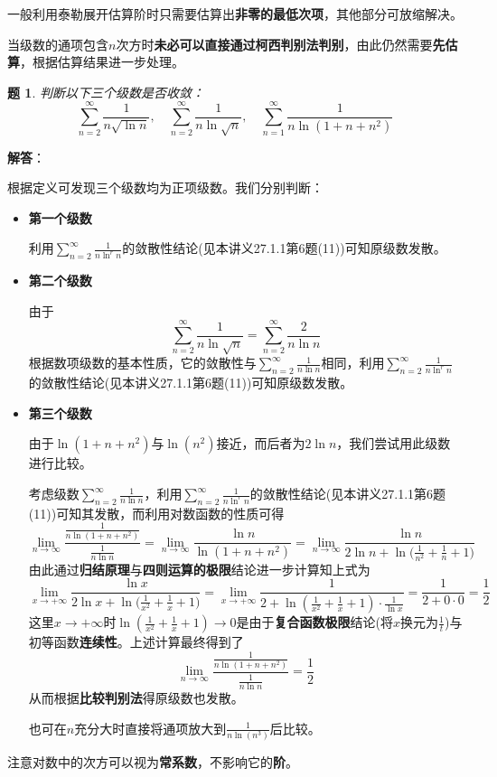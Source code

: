 \documentclass[a4paper,UTF8,fontset=windows,AutoFakeBold]{ctexart}
\newcommand*{\suminf}[1][n=1]{\sum_{#1}^\infty}
\newcommand*{\note}{\noindent *}
\theoremstyle{ex}
\newtheorem{exercise}{题}
\newcommand{\sol}[1]{{\vspace{5pt}\kaishu\noindent\textbf{解答}：\vspace{-3pt}
\begin{compactitem}
    \item[] #1
\end{compactitem}
}}
\begin{document}
\note 一般利用泰勒展开估算阶时只需要估算出\textbf{非零的最低次项}，其他部分可放缩解决。

\note 当级数的通项包含$n$次方时\textbf{未必可以直接通过柯西判别法判别}，由此仍然需要\textbf{先估算}，根据估算结果进一步处理。

\begin{framed}
\begin{exercise}
    判断以下三个级数是否收敛：
    $$\suminf[n=2]\frac{1}{n\sqrt{\ln n}},\quad\suminf[n=2]\frac{1}{n\ln\sqrt{n}},\quad\suminf\frac{1}{n\ln(1+n+n^2)}$$
\end{exercise}
\sol{
    根据定义可发现三个级数均为正项级数。我们分别判断：
    \begin{itemize}
        \item \textbf{第一个级数}
        
        利用$\suminf[n=2]\frac{1}{n\ln^rn}$的敛散性结论(见本讲义27.1.1第6题(11))可知原级数发散。

        \item \textbf{第二个级数}
        
        由于
        $$\suminf[n=2]\frac{1}{n\ln\sqrt{n}}=\suminf[n=2]\frac{2}{n\ln n}$$
        根据数项级数的基本性质，它的敛散性与$\suminf[n=2]\frac{1}{n\ln n}$相同，利用$\suminf[n=2]\frac{1}{n\ln^rn}$的敛散性结论(见本讲义27.1.1第6题(11))可知原级数发散。

        \item \textbf{第三个级数}
        
        由于$\ln(1+n+n^2)$与$\ln(n^2)$接近，而后者为$2\ln n$，我们尝试用此级数进行比较。

        考虑级数$\suminf[n=2]\frac{1}{n\ln n}$，利用$\suminf[n=2]\frac{1}{n\ln^rn}$的敛散性结论(见本讲义27.1.1第6题(11))可知其发散，而利用对数函数的性质可得
        $$\lim_{n\to\infty}\frac{\frac{1}{n\ln(1+n+n^2)}}{\frac{1}{n\ln n}}=\lim_{n\to\infty}\frac{\ln n}{\ln(1+n+n^2)}=\lim_{n\to\infty}\frac{\ln n}{2\ln n+\ln\big(\frac{1}{n^2}+\frac{1}{n}+1\big)}$$
        由此通过\textbf{归结原理}与\textbf{四则运算的极限}结论进一步计算知上式为
        $$\lim_{x\to+\infty}\frac{\ln x}{2\ln x+\ln\big(\frac{1}{x^2}+\frac{1}{x}+1\big)}=\lim_{x\to+\infty}\frac{1}{2+\ln(\frac{1}{x^2}+\frac{1}{x}+1)\cdot\frac{1}{\ln x}}=\frac{1}{2+0\cdot0}=\frac{1}{2}$$
        这里$x\to+\infty$时$\ln(\frac{1}{x^2}+\frac{1}{x}+1)\to0$是由于\textbf{复合函数极限}结论(将$x$换元为$\frac{1}{t}$)与初等函数\textbf{连续性}。上述计算最终得到了
        $$\lim_{n\to\infty}\frac{\frac{1}{n\ln(1+n+n^2)}}{\frac{1}{n\ln n}}=\frac{1}{2}$$
        从而根据\textbf{比较判别法}得原级数也发散。
        
        \note 也可在$n$充分大时直接将通项放大到$\frac{1}{n\ln(n^3)}$后比较。
    \end{itemize}
}
\end{framed}
\note 注意对数中的次方可以视为\textbf{常系数}，不影响它的\textbf{阶}。
\end{document}
